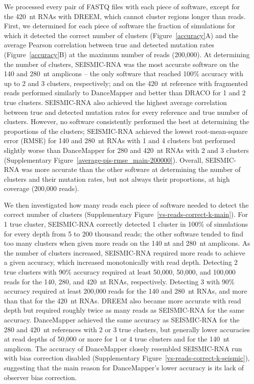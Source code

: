 \documentclass[11pt]{article}
\begin{document}
We processed every pair of FASTQ files with each piece of software, except for the 420~nt RNAs with DREEM, which cannot cluster regions longer than reads.
First, we determined for each piece of software the fraction of simulations for which it detected the correct number of clusters (Figure~\ref{accuracy}A) and the average Pearson correlation between true and detected mutation rates (Figure~\ref{accuracy}B) at the maximum number of reads (200,000).
At determining the number of clusters, SEISMIC-RNA was the most accurate software on the 140 and 280~nt amplicons -- the only software that reached 100\% accuracy with up to 2 and 3 clusters, respectively; and on the 420~nt reference with fragmented reads performed similarly to DanceMapper and better than DRACO for 1 and 2 true clusters.
SEISMIC-RNA also achieved the highest average correlation between true and detected mutation rates for every reference and true number of clusters.
However, no software consistently performed the best at determining the proportions of the clusters; SEISMIC-RNA achieved the lowest root-mean-square error (RMSE) for 140 and 280~nt RNAs with 1 and 4 clusters but performed slightly worse than DanceMapper for 280 and 420~nt RNAs with 2 and 3 clusters (Supplementary Figure~\ref{average-pis-rmse_main-200000}).
Overall, SEISMIC-RNA was more accurate than the other software at determining the number of clusters and their mutation rates, but not always their proportions, at high coverage (200,000 reads).

We then investigated how many reads each piece of software needed to detect the correct number of clusters (Supplementary Figure~\ref{vs-reads-correct-k-main}).
For 1 true cluster, SEISMIC-RNA correctly detected 1 cluster in 100\% of simulations for every depth from 5 to 200 thousand reads; the other software tended to find too many clusters when given more reads on the 140 nt and 280~nt amplicons.
As the number of clusters increased, SEISMIC-RNA required more reads to achieve a given accuracy, which increased monotonically with read depth.
Detecting 2 true clusters with 90\% accuracy required at least 50,000, 50,000, and 100,000 reads for the 140, 280, and 420~nt RNAs, respectively.
Detecting 3 with 90\% accuracy required at least 200,000 reads for the 140 and 280~nt RNAs, and more than that for the 420~nt RNAs.
DREEM also became more accurate with read depth but required roughly twice as many reads as SEISMIC-RNA for the same accuracy.
DanceMapper achieved the same accuracy as SEISMIC-RNA for the 280 and 420~nt references with 2 or 3 true clusters, but generally lower accuracies at read depths of 50,000 or more for 1 or 4 true clusters and for the 140~nt amplicon.
The accuracy of DanceMapper closely resembled SEISMIC-RNA run with bias correction disabled (Supplementary Figure~\ref{vs-reads-correct-k-seismic}), suggesting that the main reason for DanceMapper's lower accuracy is its lack of observer bias correction.
\end{document}
